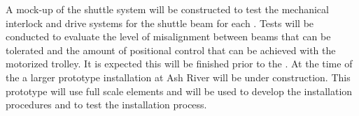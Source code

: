 A mock-up of the shuttle system will be constructed to test the
mechanical interlock and drive systems for the shuttle beam
for each .  Tests will be conducted to evaluate the level of
misalignment between beams that can be tolerated and the amount of
positional control that can be achieved with the motorized trolley. It
is expected this will be finished prior to the . At the time of the
 a larger prototype installation at Ash River will be under
construction. This prototype will use full scale elements and will be
used to develop the installation procedures and to test the
 installation process.

